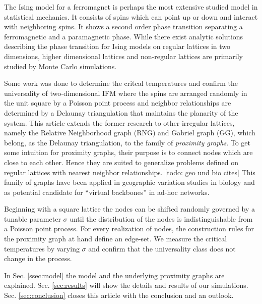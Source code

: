 The Ising model for a ferromagnet \cite{Ising1925} is perhaps the
most extensive studied model in statistical mechanics. It consists
of spins which can point up or down and interact with neighboring
spins. It shows a second order phase transition separating a
ferromagnetic and a paramagnetic phase. While there exist analytic
solutions\cite{Onsager1944,Wannier1945} describing the phase
transition for Ising models on regular lattices in two dimensions,
higher dimensional lattices and non-regular lattices are primarily studied
by Monte Carlo simulations.

Some work \cite{Janke1994,Lima2000,Lima2008} was done to determine
the critcal temperatures and confirm the universality of two-dimensional IFM
where the spins are arranged randomly in the unit square by a
Poisson point process and neighbor relationships are determined by a
Delaunay triangulation that maintains the planarity of the system.
This article extends the former research to other
irregular lattices, namely the Relative Neighborhood graph (RNG) and
Gabriel graph (GG), which belong, as the Delaunay triangulation, to the
family of \emph{proximity graphs}. To get some intuition for proximity
graphs, their purpose is to connect nodes which are close to each other.
Hence they are suited to generalize problems defined on regular lattices
with nearest neighbor relationships.
[todo: geo und bio cites] \cite{Karp2000} \cite{Santi2005} \cite{Bose2001} \cite{Kuhn2003} \cite{Selander1975} \cite{Sokal1978} \cite{Sokal1980}
This family of graphs have been applied in geographic variation studies in
biology and as potential candidate for ``virtual backbones'' in ad-hoc
networks. %

Beginning with a square lattice the nodes can be shifted randomly governed
by a tunable parameter $\sigma$ until the distribution of the nodes is
indistinguishable from a Poisson point process.
For every realization of nodes, the construction rules for the proximity
graph at hand define an edge-set.
We measure the critical temperatures by varying $\sigma$ and confirm that
the universality class does not change in the process.


In Sec. \ref{ssec:model} the model and the underlying proximity graphs
are explained. Sec. \ref{sec:results} will show the
details and results of our simulations. Sec. \ref{sec:conclusion}
closes this article with the conclusion and an outlook.

